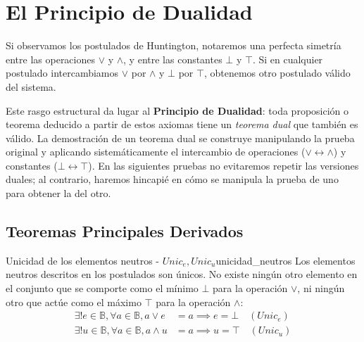 \chapter{El Principio de Dualidad}
Si observamos los postulados de Huntington, notaremos una perfecta simetría entre las operaciones $\vee$ y $\wedge$, y entre las constantes $\bot$ y $\top$. Si en cualquier postulado intercambiamos $\vee$ por $\wedge$ y $\bot$ por $\top$, obtenemos otro postulado válido del sistema. 

Este rasgo estructural da lugar al \textbf{Principio de Dualidad}: toda proposición o teorema deducido a partir de estos axiomas tiene un \textit{teorema dual} que también es válido. La demostración de un teorema dual se construye manipulando la prueba original y aplicando sistemáticamente el intercambio de operaciones ($\vee \leftrightarrow \wedge$) y constantes ($\bot \leftrightarrow \top$). En las siguientes pruebas no evitaremos repetir las versiones duales; al contrario, haremos hincapié en cómo se manipula la prueba de uno para obtener la del otro.

\section{Teoremas Principales Derivados}

\begin{teorema}{Unicidad de los elementos neutros - $Unic_e, Unic_u$}{unicidad_neutros}
Los elementos neutros descritos en los postulados son únicos. No existe ningún otro elemento en el conjunto que se comporte como el mínimo $\bot$ para la operación $\vee$, ni ningún otro que actúe como el máximo $\top$ para la operación $\wedge$:
\begin{align*}
    \exists! e \in \mathbb{B}, \forall a \in \mathbb{B}, a \vee e &= a \implies e = \bot \quad (Unic_e) \\
    \exists! u \in \mathbb{B}, \forall a \in \mathbb{B}, a \wedge u &= a \implies u = \top \quad (Unic_u)
\end{align*}
\end{teorema}

